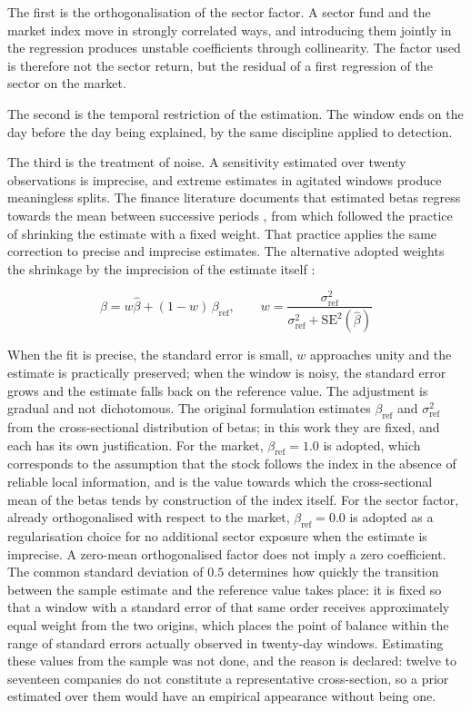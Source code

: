 The first is the orthogonalisation of the sector factor. A sector fund and the market index move
in strongly correlated ways, and introducing them jointly in the regression produces unstable
coefficients through collinearity. The factor used is therefore not the sector return, but the
residual of a first regression of the sector on the market.

The second is the temporal restriction of the estimation. The window ends on the day before the
day being explained, by the same discipline applied to detection.

The third is the treatment of noise. A sensitivity estimated over twenty observations is
imprecise, and extreme estimates in agitated windows produce meaningless splits. The finance
literature documents that estimated betas regress towards the mean between successive periods
\autocite{blume1971risk}, from which followed the practice of shrinking the estimate with a fixed
weight. That practice applies the same correction to precise and imprecise estimates. The
alternative adopted weights the shrinkage by the imprecision of the estimate itself
\autocite{vasicek1973beta}:

\begin{equation}
\beta = w \hat{\beta} + (1-w)\,\beta_{\text{ref}}, \qquad w = \frac{\sigma^2_{\text{ref}}}{\sigma^2_{\text{ref}} + \mathrm{SE}^2(\hat{\beta})}
\label{eq:vasicek}
\end{equation}

When the fit is precise, the standard error is small, $w$ approaches unity and the estimate is
practically preserved; when the window is noisy, the standard error grows and the estimate falls
back on the reference value. The adjustment is gradual and not dichotomous. The original
formulation estimates $\beta_{\text{ref}}$ and $\sigma^2_{\text{ref}}$ from the cross-sectional
distribution of betas; in this work they are fixed, and each has its own justification. For the
market, $\beta_{\text{ref}} = 1.0$ is adopted, which corresponds to the assumption that the stock
follows the index in the absence of reliable local information, and is the value towards which the
cross-sectional mean of the betas tends by construction of the index itself. For the sector factor,
already orthogonalised with respect to the market, $\beta_{\text{ref}} = 0.0$ is adopted as a
regularisation choice for no additional sector exposure when the estimate is imprecise. A
zero-mean orthogonalised factor does not imply a zero coefficient. The common standard deviation
of $0.5$ determines how quickly the transition
between the sample estimate and the reference value takes place: it is fixed so that a window with
a standard error of that same order receives approximately equal weight from the two origins, which
places the point of balance within the range of standard errors actually observed in twenty-day
windows. Estimating these values from the sample was not done, and the reason is declared: twelve
to seventeen companies do not constitute a representative cross-section, so a prior estimated over
them would have an empirical appearance without being one.

